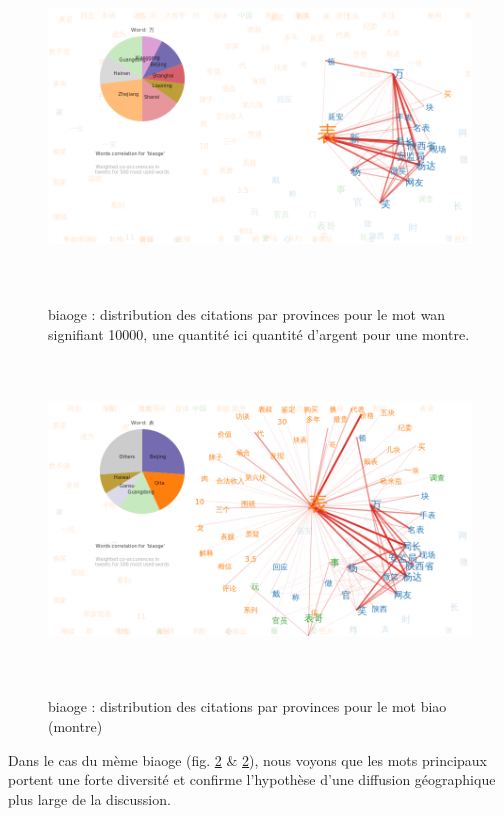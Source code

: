\begin{figure}[H]
    \centering
    \includegraphics[width=6.0087in,height=3.3386in]{figures/chap4/chapitre4-img59.png}
    \label{fig:biaoge-words-pie-wan}
    \caption{
      biaoge : distribution des citations par provinces pour le mot wan signifiant 10000, une quantit\'e ici quantit\'e d{\textquoteright}argent pour une montre.
    }
\end{figure}
 



\begin{figure}[H]
  \centering
  \includegraphics[width=6.0087in,height=3.3386in]{figures/chap4/chapitre4-img60.png}
  \label{fig:biaoge-words-pie-biao}
  \caption{
     biaoge : distribution des citations par provinces pour le mot biao (montre)
  }
\end{figure}


Dans le cas du m\`eme biaoge (fig. \ref{fig:biaoge-words-pie-biao} \& \ref{fig:biaoge-words-pie-biao}), nous voyons que les mots principaux
portent une forte diversit\'e et confirme l{\textquoteright}hypoth\`ese
d{\textquoteright}une diffusion g\'eographique plus large de la
discussion.


